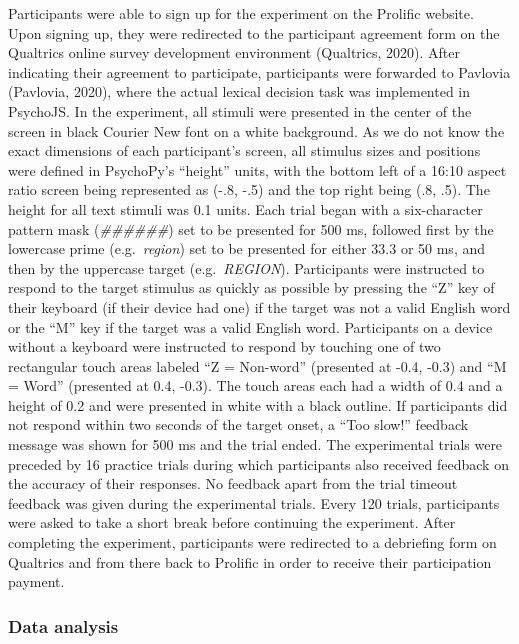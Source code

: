 \documentclass[
  english,
  man,floatsintext]{apa6}
\begin{document}
Participants were able to sign up for the experiment on the Prolific website. Upon signing up, they were redirected to the participant agreement form on the Qualtrics online survey development environment (Qualtrics, 2020). After indicating their agreement to participate, participants were forwarded to Pavlovia (Pavlovia, 2020), where the actual lexical decision task was implemented in PsychoJS. In the experiment, all stimuli were presented in the center of the screen in black Courier New font on a white background. As we do not know the exact dimensions of each participant's screen, all stimulus sizes and positions were defined in PsychoPy's ``height'' units, with the bottom left of a 16:10 aspect ratio screen being represented as (-.8, -.5) and the top right being (.8, .5). The height for all text stimuli was 0.1 units. Each trial began with a six-character pattern mask (\emph{\#\#\#\#\#\#}) set to be presented for 500 ms, followed first by the lowercase prime (e.g.~\emph{region}) set to be presented for either 33.3 or 50 ms, and then by the uppercase target (e.g.~\emph{REGION}). Participants were instructed to respond to the target stimulus as quickly as possible by pressing the ``Z'' key of their keyboard (if their device had one) if the target was not a valid English word or the ``M'' key if the target was a valid English word. Participants on a device without a keyboard were instructed to respond by touching one of two rectangular touch areas labeled ``Z = Non-word'' (presented at -0.4, -0.3) and ``M = Word'' (presented at 0.4, -0.3). The touch areas each had a width of 0.4 and a height of 0.2 and were presented in white with a black outline. If participants did not respond within two seconds of the target onset, a ``Too slow!'' feedback message was shown for 500 ms and the trial ended. The experimental trials were preceded by 16 practice trials during which participants also received feedback on the accuracy of their responses. No feedback apart from the trial timeout feedback was given during the experimental trials. Every 120 trials, participants were asked to take a short break before continuing the experiment. After completing the experiment, participants were redirected to a debriefing form on Qualtrics and from there back to Prolific in order to receive their participation payment.

\hypertarget{data-analysis}{%
\subsubsection{Data analysis}\label{data-analysis}}
\end{document}
